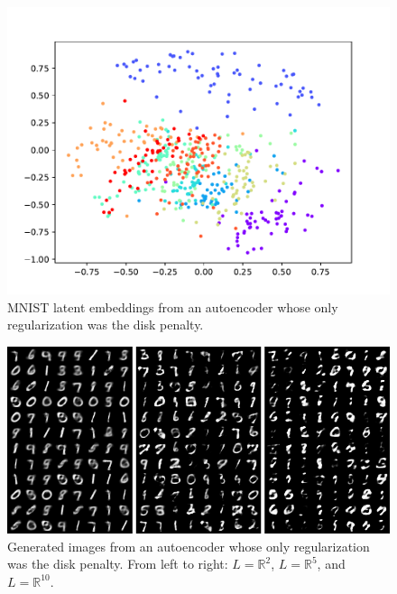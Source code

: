 \documentclass[conference]{IEEEtran}
\newcommand{\R}{\mathbb{R}}
\begin{document}
\begin{figure}[H]
	\centering
	\includegraphics[scale=0.5]{fig/only-disc-latent.pdf}
	\caption{MNIST latent embeddings from an autoencoder whose only regularization was the disk penalty.}
	\label{only-disc-latent}
\end{figure}

\begin{figure}[H]
	\centering
	\includegraphics[scale=0.3]{fig/only-disc-comparison.png}
	\caption{Generated images from an autoencoder whose only regularization was the disk penalty. From left to right: $L=\R^2$, $L=\R^{5}$, and $L=\R^{10}$.}
	\label{only-disc-images}
\end{figure}

\nocite{ae-survey}



\end{document}
